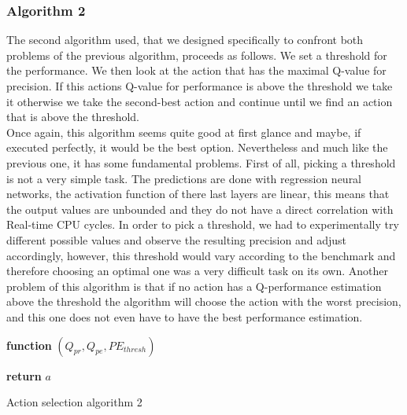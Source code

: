 \subsubsection{Algorithm 2}
The second algorithm used, that we designed specifically to confront both problems of the previous algorithm, proceeds as follows. We set a threshold for the performance. We then look at the action that has the maximal Q-value for precision. If this actions Q-value for performance is above the threshold we take it otherwise we take the second-best action and continue until we find an action that is above the threshold.\\
Once again, this algorithm seems quite good at first glance and maybe, if executed perfectly, it would be the best option. Nevertheless and much like the previous one, it has some fundamental problems. First of all, picking a threshold is not a very simple task. The predictions are done with regression neural networks, the activation function of there last layers are linear, this means that the output values are unbounded and they do not have a direct correlation with Real-time CPU cycles. In order to pick a threshold, we had to experimentally try different possible values and observe the resulting precision and adjust accordingly, however, this threshold would vary according to the benchmark and therefore choosing an optimal one was a very difficult task on its own. Another problem of this algorithm is that if no action has a Q-performance estimation above the threshold the algorithm will choose the action with the worst precision, and this one does not even have to have the best performance estimation. 
\begin{center}
	\begin{algorithm}[H]

    \textbf{function}  $(Q_{pr},Q_{pe},PE_{thresh})$\;
    
    
    \Indp{}\Indm
    \Indp{} \Indm
    \Indp
    
   
  
   \textbf{return} $a$
   
    
\caption{Action selection algorithm 2}
\end{algorithm}
\end{center}
